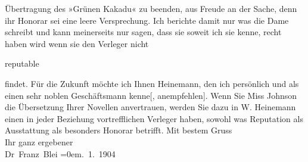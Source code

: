 \begin{ledgroupsized}[t]{13cm}
               Übertragung des »Grünen Kakadu« {\pb}zu beenden, aus Freude an der Sache, denn
               ihr Honorar sei eine leere Versprechung. Ich berichte damit nur was die Dame schreibt und kann
               meinerseits nur sagen, dass sie soweit ich sie kenne, recht haben wird wenn sie den
                  Verleger nicht \begin{otherlanguage}{english}reputable\end{otherlanguage} findet. Für die Zukunft möchte ich Ihnen Heinemann, den ich persönlich und als einen sehr
               noblen Geschäftsmann {\pb}kenne{[},
                  anempfehlen{]}. Wenn Sie Miss Johnson die Übersetzung Ihrer Novellen anvertrauen, werden Sie dazu in W. Heinemann einen in jeder Beziehung
               vortrefflichen Verleger haben, sowohl was Reputation als Ausstattung als besonders
               Honorar betrifft.\pend
           \pstart
           Mit bestem Gruss{\\[\baselineskip]}Ihr ganz ergebener{\\[\baselineskip]}\spacefill\mbox{Dr Franz Blei}\pend
           \leftskip=0em{}. 1. 1904\pend
           
         
         \endnumbering{}\end{ledgroupsized}  \newcommand{\dateiname}{L01356}\newcommand{\titel}{Franz Blei an Arthur Schnitzler, 4. 1. 1904}\newcommand{\editorInnen}{Martin Anton Müller und Gerd-Hermann Susen}
      